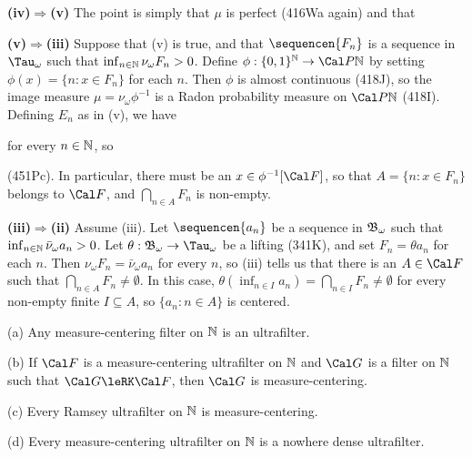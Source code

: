 {\medskip

{\bf (iv)$\Rightarrow$(v)} The point is simply that $\mu$ is perfect
(416Wa again) and that


\medskip

{\bf (v)$\Rightarrow$(iii)} Suppose that (v) is true, and that
$\sequencen{F_n}$ is a sequence in $\Tau_{\omega}$ such that
$\inf_{n\in\Bbb N}\nu_{\omega}F_n>0$.   Define
$\phi:\{0,1\}^{\Bbb N}\to\Cal P\Bbb N$ by setting
$\phi(x)=\{n:x\in F_n\}$ for each $n$.   Then $\phi$ is almost continuous
(418J), so the image measure $\mu=\nu_{\omega}\phi^{-1}$ is a Radon
probability measure on $\Cal P\Bbb N$ (418I).
Defining $E_n$ as in (v), we have


\noindent for every $n\in\Bbb N$, so


\noindent (451Pc).   In particular, there must be an
$x\in\phi^{-1}[\Cal F]$, so that $A=\{n:x\in F_n\}$ belongs to $\Cal F$,
and $\bigcap_{n\in A}F_n$ is non-empty.

\medskip

{\bf (iii)$\Rightarrow$(ii)} Assume (iii).   Let $\sequencen{a_n}$ be a
sequence in $\frak B_{\omega}$ such that
$\inf_{n\in\Bbb N}\bar\nu_{\omega}a_n>0$.   Let
$\theta:\frak B_{\omega}\to\Tau_{\omega}$ be a lifting (341K), and set
$F_n=\theta a_n$ for each $n$.   Then $\nu_{\omega}F_n=\bar\nu_{\omega}a_n$
for every $n$, so (iii) tells us that there is an $A\in\Cal F$ such that
$\bigcap_{n\in A}F_n\ne\emptyset$.   In this case,
$\theta(\inf_{n\in I}a_n)=\bigcap_{n\in I}F_n\ne\emptyset$
for every non-empty finite $I\subseteq A$, so $\{a_n:n\in A\}$ is centered.
}%

(a) Any measure-centering filter on $\Bbb N$ is an ultrafilter.

(b) If $\Cal F$ is a measure-centering
ultrafilter on $\Bbb N$ and $\Cal G$ is a filter on
$\Bbb N$ such that $\Cal G\leRK\Cal F$, then $\Cal G$ is measure-centering.

(c) Every Ramsey ultrafilter on $\Bbb N$ is measure-centering.

(d) Every
measure-centering ultrafilter on $\Bbb N$ is a nowhere dense ultrafilter.

